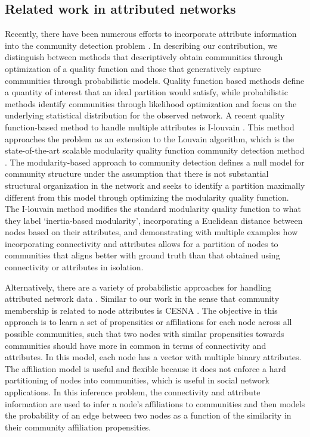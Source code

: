 \subsection{Related work in attributed networks}
Recently, there have been numerous efforts to incorporate attribute information into the community detection problem \cite{cesna,clauset,ilouvain,hric,peel2017ground}. In describing our contribution, we distinguish between methods that descriptively obtain communities through optimization of a quality function and those that generatively capture communities through probabilistic models. Quality function based methods define a quantity of interest that an ideal partition would satisfy, while probabilistic methods identify communities through likelihood optimization and focus on the underlying statistical distribution for the observed network. A recent quality function-based method to handle multiple attributes is I-louvain \cite{ilouvain}. This method approaches the problem as an extension to the Louvain algorithm, which is the state-of-the-art scalable modularity quality function community detection method \cite{blondel}. The modularity-based approach to community detection defines a null model for community structure under the assumption that there is not substantial structural organization in the network and seeks to identify a partition maximally different from this model through optimizing the modularity quality function. The I-louvain method modifies the standard modularity quality function to what they label `inertia-based modularity', incorporating a Euclidean distance between nodes based on their attributes, and demonstrating with multiple examples how incorporating connectivity and attributes allows for a partition of nodes to communities that aligns better with ground truth than that obtained using connectivity or attributes in isolation.

Alternatively, there are a variety of probabilistic approaches for handling attributed network data \cite{clauset,hric,peel2017ground,cesna}. Similar to our work in the sense that community membership is related to node attributes is CESNA \cite{cesna}. The objective in this approach is to learn a set of propensities or affiliations for each node across all possible communities, such that two nodes with similar propensities towards communities should have more in common in terms of connectivity and attributes. In this model, each node has a vector with multiple binary attributes. The affiliation model is useful and flexible because it does not enforce a hard partitioning of nodes into communities, which is useful in social network applications. In this inference problem, the connectivity and attribute information are used to infer a node's affiliations to communities and then models the probability of an edge between two nodes as a function of the similarity in their community affiliation propensities. 

